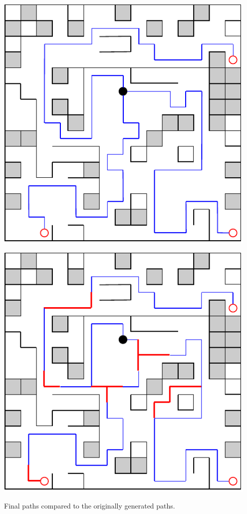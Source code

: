 \begin{center}
    \captionsetup{type=figure}
    \begin{minipage}{.5\textwidth}
        \centering
        \includegraphics[width=0.95\textwidth]{img/Paths and world.pdf}
    \end{minipage}%
    \begin{minipage}{.5\textwidth}
        \centering
        \includegraphics[width=0.95\textwidth]{img/Final Paths.pdf}
    \end{minipage}
    \caption{Final paths compared to the originally generated paths.}
    \label{fig:final-paths}
\end{center}

